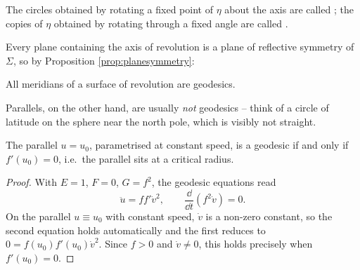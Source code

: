 \documentclass[a4paper]{scrartcl}
\begin{document}
\begin{definition}
    The circles obtained by rotating a fixed point of $\eta$ about the axis are called ; the copies of $\eta$ obtained by rotating through a fixed angle are called .
\end{definition}
\begin{center}
\end{center}

Every plane containing the axis of revolution is a plane of reflective symmetry of $\Sigma$, so by Proposition \ref{prop:planesymmetry}:

\begin{corollary}
    All meridians of a surface of revolution are geodesics.
\end{corollary}

Parallels, on the other hand, are usually \emph{not} geodesics -- think of a circle of latitude on the sphere near the north pole, which is visibly not straight.

\begin{lemma}
    The parallel $u = u_0$, parametrised at constant speed, is a geodesic if and only if $f'(u_0) = 0$, i.e.\ the parallel sits at a critical radius.
\end{lemma}
\begin{proof}
    With $E = 1$, $F = 0$, $G = f^2$, the geodesic equations read
    $$
    \ddot u = f f' \dot v^2, \qquad \frac{\dd}{\dd t}\left(f^2 \dot v\right) = 0.
    $$
    On the parallel $u \equiv u_0$ with constant speed, $\dot v$ is a non-zero constant, so the second equation holds automatically and the first reduces to $0 = f(u_0) f'(u_0) \dot v^2$. Since $f > 0$ and $\dot v \neq 0$, this holds precisely when $f'(u_0) = 0$.
\end{proof}
\end{document}
